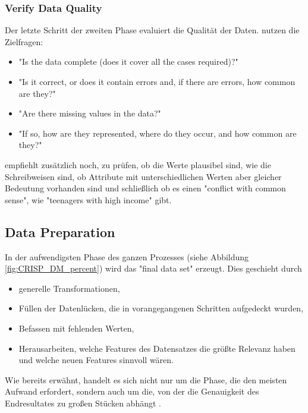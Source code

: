 \subsubsection{Verify Data Quality}
Der letzte Schritt der zweiten Phase evaluiert die Qualität der Daten. \citep[S.19]{chapman_crisp-dm_2000} nutzen die Zielfragen: 
\begin{itemize}
\item "Is the data complete (does it cover all the cases required)?"
\item "Is it correct, or does it contain errors and, if there are errors, how common are they?"
\item "Are there missing values in the data?"
\item "If so, how are they represented, where do they occur, and how common
are they?"
\end{itemize}
\citep[S.~16]{shearer_crisp-dm_2000} empfiehlt zusätzlich noch, zu prüfen, ob die Werte plausibel sind, wie die Schreibweisen sind, ob Attribute mit unterschiedlichen Werten aber gleicher Bedeutung vorhanden sind und schließlich ob es einen "conflict with common sense", wie "teenagers with high income"\citep[S.~16]{shearer_crisp-dm_2000} gibt. 
\subsection{Data Preparation}\label{subsubsec:DataPreperation}
In der aufwendigsten Phase des ganzen Prozesses (siehe Abbildung \ref{fig:CRISP_DM_percent}) wird das "final data set" erzeugt. Dies geschieht durch\citep[S.~73]{swamynathan_mastering_2017}
\begin{itemize}
\item generelle Transformationen,
\item Füllen der Datenlücken, die in vorangegangenen Schritten aufgedeckt wurden,
\item Befassen mit fehlenden Werten,
\item Herausarbeiten, welche Features des Datensatzes die größte Relevanz haben und welche neuen Features sinnvoll wären.
\end{itemize}
Wie bereits erwähnt, handelt es sich nicht nur um die Phase, die den meisten Aufwand erfordert, sondern auch um die, von der die Genauigkeit des Endresultates zu großen Stücken abhängt \citep[S.~73]{swamynathan_mastering_2017}.

